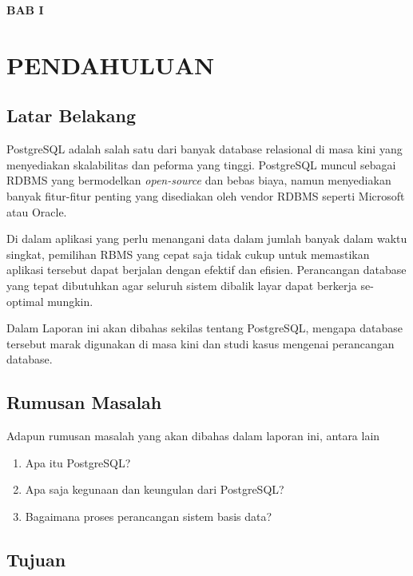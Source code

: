 \documentclass[12pt,a4paper]{article}
\begin{document}
\newpage


\begin{center}
  \large{\textbf{BAB I}}

  \section*{PENDAHULUAN}
\end{center}

\vspace{1cm}

\subsection{Latar Belakang}

PostgreSQL adalah salah satu dari banyak database relasional di masa
kini yang menyediakan skalabilitas dan peforma yang tinggi. PostgreSQL
muncul sebagai RDBMS yang bermodelkan \emph{open-source} dan bebas biaya,
namun menyediakan banyak fitur-fitur penting yang disediakan oleh vendor 
RDBMS seperti Microsoft atau Oracle.

Di dalam aplikasi yang perlu menangani data dalam jumlah banyak dalam
waktu singkat, pemilihan RBMS yang cepat saja tidak cukup untuk memastikan
aplikasi tersebut dapat berjalan dengan efektif dan efisien. Perancangan
database yang tepat dibutuhkan agar seluruh sistem dibalik layar dapat
berkerja se-optimal mungkin.

Dalam Laporan ini akan dibahas sekilas tentang PostgreSQL, mengapa database
tersebut marak digunakan di masa kini dan studi kasus mengenai perancangan
database.

\subsection{Rumusan Masalah}

Adapun rumusan masalah yang akan dibahas dalam laporan ini, antara lain

\begin{enumerate}
  \item Apa itu PostgreSQL?
  \item Apa saja kegunaan dan keungulan dari PostgreSQL?
  \item Bagaimana proses perancangan sistem basis data?
\end{enumerate}

\subsection{Tujuan}
\end{document}

